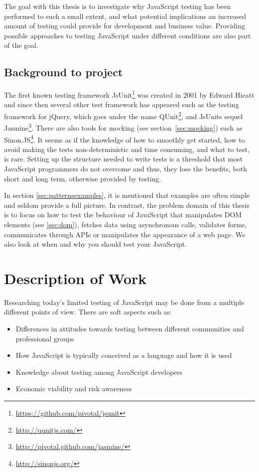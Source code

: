 \documentclass[11pt]{article}
\begin{document}
The goal with this thesis is to investigate why JavaScript testing has been performed to such a small extent, and what potential implications an increased amount of testing could provide for development and business value. Providing possible approaches to testing JavaScript under different conditions are also part of the goal. %

\subsection{Background to project}

The first known testing framework JsUnit\footnote{\url{https://github.com/pivotal/jsunit}} was created in 2001 by Edward Hieatt\cite{GoingFaster} and since then several other test framework has appeared such as the testing framework for jQuery, which goes under the name QUnit\footnote{\url{http://qunitjs.com/}}, and JsUnits sequel Jasmine\footnote{\url{http://pivotal.github.com/jasmine/}}. There are also tools for mocking (see section~\ref{sec:mocking}) such as Sinon.JS\footnote{\url{http://sinonjs.org/}}. It seems as if the knowledge of how to smoothly get started, how to avoid making the tests non-deterministic and time consuming, and what to test, is rare. Setting up the structure needed to write tests is a threshold that most JavaScript programmers do not overcome\cite{TestingStatistics} and thus, they lose the benefits, both short and long term, otherwise provided by testing.

In section \ref{sec:patternsexamples}, it is mentioned that examples are often simple and seldom provide a full picture. In contrast, the problem domain of this thesis is to focus on how to test the behaviour of JavaScript that manipulates DOM elements (see \ref{sec:dom}), fetches data using asynchronous calls, validates forms, communicates through APIs or manipulates the appearance of a web page. We also look at when and why you should test your JavaScript.

\section{Description of Work}

Researching today's limited testing of JavaScript may be done from a multiple different points of view. There are soft aspects such as:
\begin{itemize}
\item Differences in attitudes towards testing between different communities and professional groups
\item How JavaScript is typically conceived as a language and how it is used
\item Knowledge about testing among JavaScript developers
\item Economic viability and risk awareness
\end{itemize}
\end{document}

